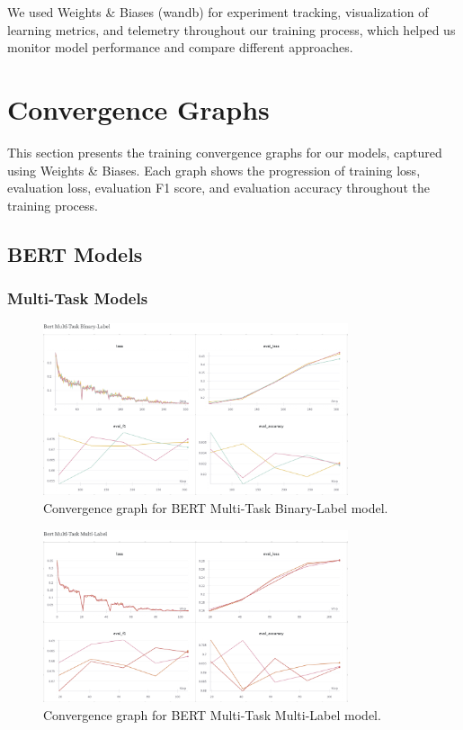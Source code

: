 \documentclass{article}
\begin{document}
We used Weights \& Biases (wandb) for experiment tracking, visualization of learning metrics, and telemetry throughout our training process, which helped us monitor model performance and compare different approaches.

\section{Convergence Graphs}
This section presents the training convergence graphs for our models, captured using Weights \& Biases. Each graph shows the progression of training loss, evaluation loss, evaluation F1 score, and evaluation accuracy throughout the training process.

\subsection{BERT Models}

\subsubsection{Multi-Task Models}
\begin{figure}[H]
    \centering
    \includegraphics[width=0.8\textwidth]{convergence_graphs/bert_mtbl.png}
    \caption{Convergence graph for BERT Multi-Task Binary-Label model.}
    \label{fig:bert_mtbl}
\end{figure}

\begin{figure}[H]
    \centering
    \includegraphics[width=0.8\textwidth]{convergence_graphs/bert_mtml.png}
    \caption{Convergence graph for BERT Multi-Task Multi-Label model.}
    \label{fig:bert_mtml}
\end{figure}
\end{document}
